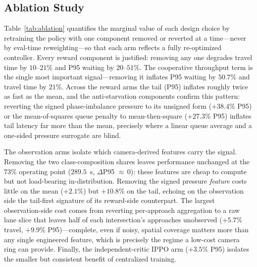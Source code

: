 \begin{table}[t]
\begin{minipage}[t]{0.48\columnwidth}
    \vspace{0.6mm}
    \label{tab:ood}
  \end{minipage}
\end{table}

\subsection{Ablation Study}
\label{sec:ablations}
Table~\ref{tab:ablation} quantifies the marginal value of each design choice by retraining the
policy with one component removed or reverted at a time---never by eval-time reweighting---so that
each arm reflects a fully re-optimized controller. Every reward component is justified: removing
any one degrades travel time by $10$--$21\%$ and P95 waiting by $20$--$51\%$. The cooperative
throughput term is the single most important signal---removing it inflates P95 waiting by $50.7\%$
and travel time by $21\%$. Across the reward arms the tail (P95) inflates roughly twice as fast as
the mean, and the anti-starvation components confirm this pattern: reverting the signed
phase-imbalance pressure to its unsigned form ($+38.4\%$ P95) or the mean-of-squares queue penalty
to mean-then-square ($+27.3\%$ P95) inflates tail latency far more than the mean, precisely where
a linear queue average and a one-sided pressure surrogate are blind.

The observation arms isolate which camera-derived features carry the signal. Removing the two
class-composition shares leaves performance unchanged at the $73\%$ operating point ($289.5$~s,
$\Delta$P95 ${\approx}\,0$): these features are cheap to compute but not load-bearing
in-distribution. Removing the signed pressure \emph{feature} costs little on the mean ($+2.1\%$)
but $+10.8\%$ on the tail, echoing on the observation side the tail-first signature of its
reward-side counterpart. The largest observation-side cost comes from reverting per-approach
aggregation to a raw lane slice that leaves half of each intersection's approaches unobserved
($+5.7\%$ travel, $+9.9\%$ P95)---complete, even if noisy, spatial coverage matters more than any
single engineered feature, which is precisely the regime a low-cost camera ring can provide.
Finally, the independent-critic IPPO arm ($+3.5\%$ P95) isolates the smaller but consistent
benefit of centralized training.

